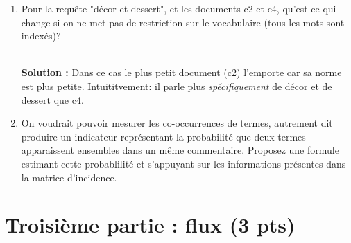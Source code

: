 \documentclass[10pt,a4paper]{article}
\newenvironment{solution}[0]{
~\\ \color{red} \textbf{Solution : }\color{black}}{%
}
\begin{document}
\begin{enumerate}
Expliquez brièvement la raison  du classement pour le premier document.

\begin{solution}
Les cosinus (requête non normalisée).

\begin{itemize}
  \item plat\,: c1 : $\frac{1}{\sqrt{2}}$;  
       c4 : $\frac{1}{\sqrt{3}}$; 
       c5 : $\frac{2}{\sqrt{6}}$; 
  
  \item décor et dessert\,: 
  
    c2 : $\frac{1+1}{\sqrt{3}}$; 
    c4 :  $\frac{1+1}{\sqrt{3}}$  
    c5 : $\frac{1}{\sqrt{6}}$; 

  \item vin et plat
  
    c1 : $\frac{1+1}{\sqrt{2}}$; 
    c2 : $\frac{1}{\sqrt{3}}$;
    c3 :  $\frac{2}{\sqrt{3}}$  
    c4 :  $\frac{1}{\sqrt{3}}$  
    c5 : $\frac{1+2}{\sqrt{6}}$; 
    
 \end{itemize}

\end{solution}  

   \item Pour la requête "décor et dessert", et les documents c2 et c4,
   qu'est-ce qui change si on ne met pas de restriction 
   sur le vocabulaire (tous les mots sont indexés)?
   
\begin{solution}
Dans ce cas le plus petit document (c2) l'emporte car sa norme est
plus petite. Intuititvement: il parle plus \emph{spécifiquement} de
décor et de dessert que c4.
\end{solution}   
    
\item On voudrait pouvoir mesurer les co-occurrences de termes, autrement dit
    produire un indicateur représentant la probabilité que deux termes
    apparaissent ensembles dans un même commentaire. Proposez une formule estimant
    cette probablilité et s'appuyant
      sur les informations présentes dans la matrice d'incidence.

\end{enumerate}


\section*{Troisième partie : flux (3 pts)}
\end{document}
